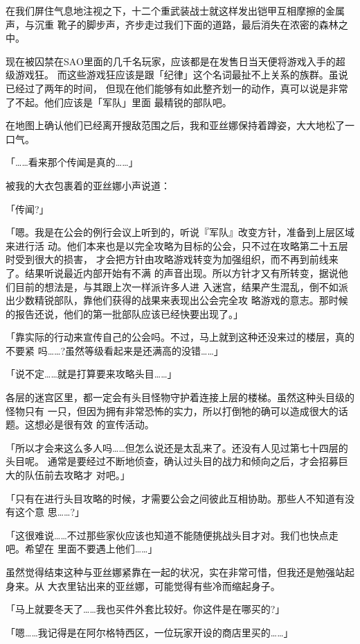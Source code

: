 \documentclass[11pt]{book}
\begin{document}
在我们屏住气息地注视之下，十二个重武装战士就这样发出铠甲互相摩擦的金属声，与沉重
靴子的脚步声，齐步走过我们下面的道路，最后消失在浓密的森林之中。

现在被囚禁在SAO里面的几千名玩家，应该都是在发售日当天便将游戏入手的超级游戏狂。
而这些游戏狂应该是跟「纪律」这个名词最扯不上关系的族群。虽说已经过了两年的时间，
但现在他们能够有如此整齐划一的动作，真可以说是非常了不起。他们应该是「军队」里面
最精锐的部队吧。

在地图上确认他们已经离开搜敌范围之后，我和亚丝娜保持着蹲姿，大大地松了一口气。

「……看来那个传闻是真的……」

被我的大衣包裹着的亚丝娜小声说道：

「传闻?」

「嗯。我是在公会的例行会议上听到的，听说『军队』改变方针，准备到上层区域来进行活
动。他们本来也是以完全攻略为目标的公会，只不过在攻略第二十五层时受到很大的损害，
才会把方针由攻略游戏转变为加强组织，而不再到前线来了。结果听说最近内部开始有不满
的声音出现。所以方针才又有所转变，据说他们目前的想法是，与其跟上次一样派许多人进
入迷宫，结果产生混乱，倒不如派出少数精锐部队，靠他们获得的战果来表现出公会完全攻
略游戏的意志。那时候的报告还说，他们的第一批部队应该已经快要出现了。」

「靠实际的行动来宣传自己的公会吗。不过，马上就到这种还没来过的楼层，真的不要紧
吗……?虽然等级看起来是还满高的没错……」

「说不定……就是打算要来攻略头目……」

各层的迷宫区里，都一定会有头目怪物守护着连接上层的楼梯。虽然这种头目级的怪物只有
一只，但因为拥有非常恐怖的实力，所以打倒牠的确可以造成很大的话题。这想必是很有效
的宣传活动。

「所以才会来这么多人吗……但怎么说还是太乱来了。还没有人见过第七十四层的头目呢。
通常是要经过不断地侦查，确认过头目的战力和倾向之后，才会招募巨大的队伍前去攻略才
对吧。」

「只有在进行头目攻略的时候，才需要公会之间彼此互相协助。那些人不知道有没有这个意
思……?」

「这很难说……不过那些家伙应该也知道不能随便挑战头目才对。我们也快点走吧。希望在
里面不要遇上他们……」

虽然觉得结束这种与亚丝娜紧靠在一起的状况，实在非常可惜，但我还是勉强站起身来。从
大衣里钻出来的亚丝娜，可能觉得有些冷而缩起身子。

「马上就要冬天了……我也买件外套比较好。你这件是在哪买的?」

「嗯……我记得是在阿尔格特西区，一位玩家开设的商店里买的……」
\end{document}
